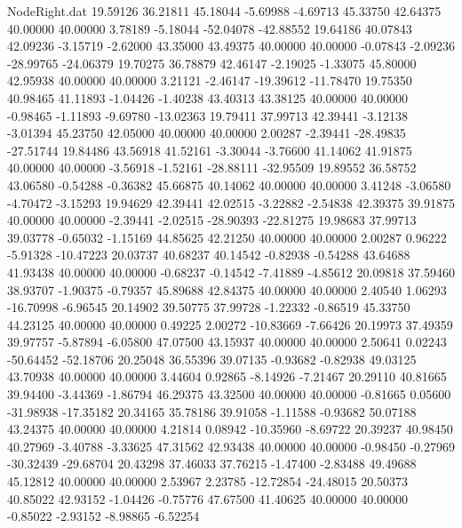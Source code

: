 \begin{filecontents}{NodeRight.dat}
  19.59126   36.21811   45.18044    -5.69988   -4.69713   45.33750   42.64375   40.00000   40.00000    3.78189   -5.18044  -52.04078  -42.88552
  19.64186   40.07843   42.09236    -3.15719   -2.62000   43.35000   43.49375   40.00000   40.00000   -0.07843   -2.09236  -28.99765  -24.06379
  19.70275   36.78879   42.46147    -2.19025   -1.33075   45.80000   42.95938   40.00000   40.00000    3.21121   -2.46147  -19.39612  -11.78470
  19.75350   40.98465   41.11893    -1.04426   -1.40238   43.40313   43.38125   40.00000   40.00000   -0.98465   -1.11893   -9.69780  -13.02363
  19.79411   37.99713   42.39441    -3.12138   -3.01394   45.23750   42.05000   40.00000   40.00000    2.00287   -2.39441  -28.49835  -27.51744
  19.84486   43.56918   41.52161    -3.30044   -3.76600   41.14062   41.91875   40.00000   40.00000   -3.56918   -1.52161  -28.88111  -32.95509
  19.89552   36.58752   43.06580    -0.54288   -0.36382   45.66875   40.14062   40.00000   40.00000    3.41248   -3.06580   -4.70472   -3.15293
  19.94629   42.39441   42.02515    -3.22882   -2.54838   42.39375   39.91875   40.00000   40.00000   -2.39441   -2.02515  -28.90393  -22.81275
  19.98683   37.99713   39.03778    -0.65032   -1.15169   44.85625   42.21250   40.00000   40.00000    2.00287    0.96222   -5.91328  -10.47223
  20.03737   40.68237   40.14542    -0.82938   -0.54288   43.64688   41.93438   40.00000   40.00000   -0.68237   -0.14542   -7.41889   -4.85612
  20.09818   37.59460   38.93707    -1.90375   -0.79357   45.89688   42.84375   40.00000   40.00000    2.40540    1.06293  -16.70998   -6.96545
  20.14902   39.50775   37.99728    -1.22332   -0.86519   45.33750   44.23125   40.00000   40.00000    0.49225    2.00272  -10.83669   -7.66426
  20.19973   37.49359   39.97757    -5.87894   -6.05800   47.07500   43.15937   40.00000   40.00000    2.50641    0.02243  -50.64452  -52.18706
  20.25048   36.55396   39.07135    -0.93682   -0.82938   49.03125   43.70938   40.00000   40.00000    3.44604    0.92865   -8.14926   -7.21467
  20.29110   40.81665   39.94400    -3.44369   -1.86794   46.29375   43.32500   40.00000   40.00000   -0.81665    0.05600  -31.98938  -17.35182
  20.34165   35.78186   39.91058    -1.11588   -0.93682   50.07188   43.24375   40.00000   40.00000    4.21814    0.08942  -10.35960   -8.69722
  20.39237   40.98450   40.27969    -3.40788   -3.33625   47.31562   42.93438   40.00000   40.00000   -0.98450   -0.27969  -30.32439  -29.68704
  20.43298   37.46033   37.76215    -1.47400   -2.83488   49.49688   45.12812   40.00000   40.00000    2.53967    2.23785  -12.72854  -24.48015
  20.50373   40.85022   42.93152    -1.04426   -0.75776   47.67500   41.40625   40.00000   40.00000   -0.85022   -2.93152   -8.98865   -6.52254

\end{filecontents}
